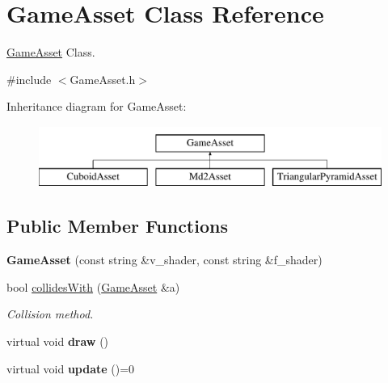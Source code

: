 \hypertarget{classGameAsset}{\section{Game\-Asset Class Reference}
\label{classGameAsset}
}


\hyperlink{classGameAsset}{Game\-Asset} Class.  




{\ttfamily \#include $<$Game\-Asset.\-h$>$}

Inheritance diagram for Game\-Asset\-:\begin{figure}[H]
\begin{center}
\leavevmode
\includegraphics[height=2.000000cm]{classGameAsset}
\end{center}
\end{figure}
\subsection*{Public Member Functions}
\begin{DoxyCompactItemize}
\item 
\hypertarget{classGameAsset_ac6d2340f41dd95e71892327dae4e1585}{{\bfseries Game\-Asset} (const string \&v\-\_\-shader, const string \&f\-\_\-shader)}\label{classGameAsset_ac6d2340f41dd95e71892327dae4e1585}

\item 
bool \hyperlink{classGameAsset_a612793ce2a354d2f8839a779d0ca2227}{collides\-With} (\hyperlink{classGameAsset}{Game\-Asset} \&a)
\begin{DoxyCompactList}\small\item\em Collision method. \end{DoxyCompactList}\item 
\hypertarget{classGameAsset_a2d7e18a8f1dd8ba89ed1bd14f2affeab}{virtual void {\bfseries draw} ()}\label{classGameAsset_a2d7e18a8f1dd8ba89ed1bd14f2affeab}

\item 
\hypertarget{classGameAsset_a42688ec8f02e201eaaa01e74a112083f}{virtual void {\bfseries update} ()=0}\label{classGameAsset_a42688ec8f02e201eaaa01e74a112083f}

\end{DoxyCompactItemize}
